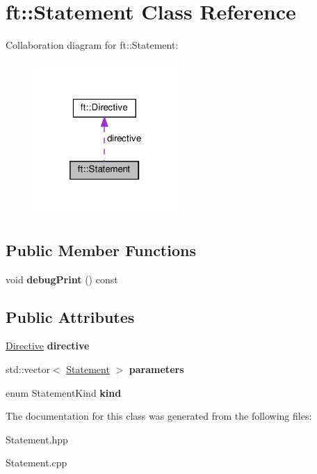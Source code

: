 \hypertarget{classft_1_1Statement}{}\section{ft\+:\+:Statement Class Reference}
\label{classft_1_1Statement}


Collaboration diagram for ft\+:\+:Statement\+:\nopagebreak
\begin{figure}[H]
\begin{center}
\leavevmode
\includegraphics[width=157pt]{classft_1_1Statement__coll__graph}
\end{center}
\end{figure}
\subsection*{Public Member Functions}
\begin{DoxyCompactItemize}
\item 
\mbox{\label{classft_1_1Statement_a8683a9b2bbae06e4d40f5a29a79e1121}} 
void {\bfseries debug\+Print} () const
\end{DoxyCompactItemize}
\subsection*{Public Attributes}
\begin{DoxyCompactItemize}
\item 
\mbox{\label{classft_1_1Statement_a6b09fff8cefe564d0f15e456c76733e9}} 
\hyperlink{classft_1_1Directive}{Directive} {\bfseries directive}
\item 
\mbox{\label{classft_1_1Statement_a76ce95cce6115b62f6090ec3e0726e8a}} 
std\+::vector$<$ \hyperlink{classft_1_1Statement}{Statement} $>$ {\bfseries parameters}
\item 
\mbox{\label{classft_1_1Statement_a1f3accee154723db2ae9dff3caf26fb0}} 
enum Statement\+Kind {\bfseries kind}
\end{DoxyCompactItemize}


The documentation for this class was generated from the following files\+:\begin{DoxyCompactItemize}
\item 
Statement.\+hpp\item 
Statement.\+cpp\end{DoxyCompactItemize}
